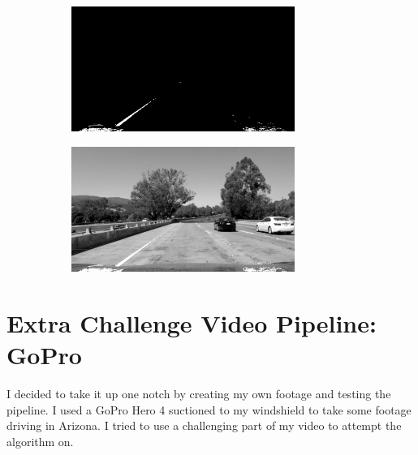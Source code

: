 \documentclass{article}
\begin{document}
\begin{figure}[htb!]
    \centering
    \caption{Yellow selection and dilation to improve lane contrast}
    
    \begin{subfigure}{0.5\textwidth}
    \centering
    \includegraphics[width=0.8\textwidth]{yellowdilate}
    \end{subfigure}%
    \begin{subfigure}{0.5\textwidth}
    \centering
    \includegraphics[width=0.8\textwidth]{graydilate}
    \end{subfigure}
\end{figure}


\section{Extra Challenge Video Pipeline: GoPro}

I decided to take it up one notch by creating my own footage and testing the pipeline. I used a GoPro Hero 4 suctioned to my windshield to take some footage driving in Arizona. I tried to use a challenging part of my video to attempt the algorithm on.
\end{document}
